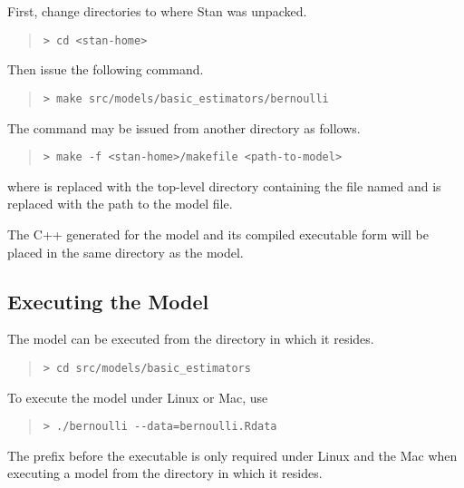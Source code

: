 First, change directories to where Stan was unpacked.
%
\begin{quote}
\begin{Verbatim}[fontshape=sl]
> cd <stan-home>
\end{Verbatim}
\end{quote}
%
Then issue the following command.
%
\begin{quote}
\begin{Verbatim}[fontshape=sl]
> make src/models/basic_estimators/bernoulli 
\end{Verbatim}
\end{quote}
%
The  command may be issued from another directory as follows.
%
\begin{quote}
\begin{Verbatim}[fontshape=sl]
> make -f <stan-home>/makefile <path-to-model>
\end{Verbatim}
\end{quote}
%
where  is replaced with the top-level directory
containing the file named  and 
is replaced with the path to the model file.

The C++ generated for the model and its compiled executable
form will be placed in the same directory as the model.


\subsection{Executing the Model}

The model can be executed from the directory in which it resides.
%
\begin{quote}
\begin{Verbatim}[fontshape=sl]
> cd src/models/basic_estimators 
\end{Verbatim}
\end{quote}
%
To execute the model under Linux or Mac, use
%
\begin{quote}
\begin{Verbatim}[fontshape=sl]
> ./bernoulli --data=bernoulli.Rdata
\end{Verbatim}
\end{quote}
%
The  prefix before the executable is only required under
Linux and the Mac when executing a model from the directory in which
it resides.

